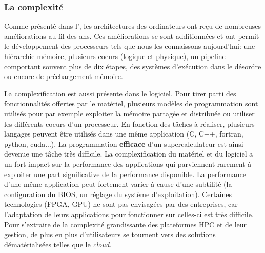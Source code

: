     \subsubsection{La complexité}\label{sec:edl_chal_complexite}
        
        Comme présenté dans l', les architectures des ordinateurs ont reçu de nombreuses améliorations au fil des ans. Ces améliorations se sont additionnées et ont permit le développement des processeurs tels que nous les connaissons aujourd'hui: une hiérarchie mémoire, plusieurs coeurs (logique et physique), un pipeline comportant souvent plus de dix étapes, des systèmes d'exécution dans le désordre ou encore de préchargement mémoire. 
        
        La complexification est aussi présente dans le logiciel. Pour tirer parti des fonctionnalités offertes par le matériel, plusieurs modèles de programmation sont utilisés pour par exemple exploiter la mémoire partagée et distribuée ou utiliser les différents coeurs d'un processeur. En fonction des tâches à réaliser, plusieurs langages peuvent être utilisés dans une même application (C, C++, fortran, python, cuda...). La programmation \textbf{efficace} d'un supercalculateur est ainsi devenue une tâche très difficile. La complexification du matériel et du logiciel a un fort impact sur la performance des applications qui parviennent rarement à exploiter une part significative de la performance disponible. La performance d’une même application peut fortement varier à cause d’une subtilité (la configuration du BIOS, un réglage du système d’exploitation). Certaines technologies (FPGA, GPU) ne sont pas envisagées par des entreprises, car l'adaptation de leurs applications pour fonctionner sur celles-ci est très difficile. Pour s'extraire de la complexité grandissante des plateformes HPC et de leur gestion, de plus en plus d'utilisateurs se tournent vers des solutions dématérialisées telles que le \textit{cloud}.
        
        

